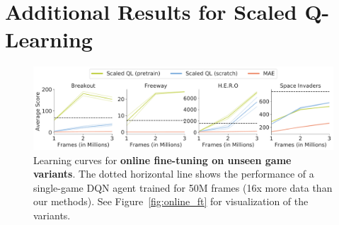 




\section{Additional Results for Scaled Q-Learning}


\begin{figure}[H]
    \centering
    \includegraphics[width=\linewidth]{chapters/scaled_ql/figures/online_ft_curve.pdf}
    \vspace{-0.4cm}
    \caption{Learning curves for \textbf{online fine-tuning on unseen game variants}. The dotted horizontal line shows the performance of a single-game DQN agent trained for 50M frames (16x more data than our methods). See Figure~\ref{fig:online_ft} for visualization of the variants.}
    \label{fig:lr_curves_online_ft}
\end{figure}


